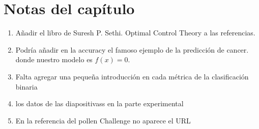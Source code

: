  \section{Notas del capítulo}
 \begin{enumerate}
     \item Añadir el libro de Suresh P. Sethi. Optimal Control Theory a las referencias.
     \item Podría añadir en la accuracy el famoso ejemplo de la predicción de cancer. donde nuestro modelo es $f(x) = 0$.
     \item Falta agregar una pequeña introducción en cada métrica de la clasificación binaria
     \item los datos de las diapositivass en la parte experimental
     \item En la referencia del pollen Challenge no aparece el URL
 \end{enumerate}
